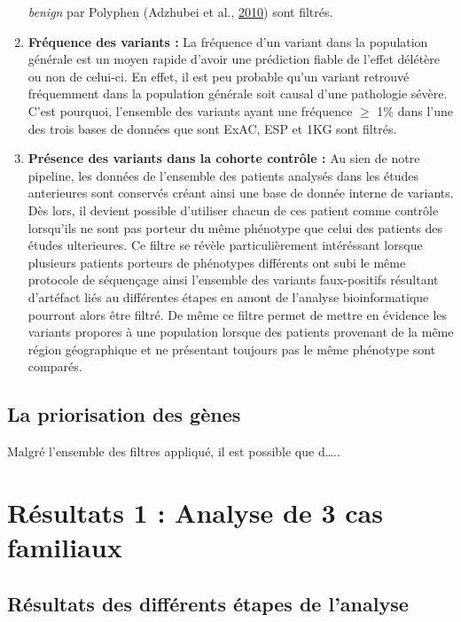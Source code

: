 \documentclass[12pt,twoside]{reedthesis}
\theoremstyle{definition}
\theoremstyle{definition}
\theoremstyle{remark}
\begin{document}
\begin{enumerate}
    \emph{benign} par Polyphen (Adzhubei et al.,
    \protect\hyperlink{ref-Adzhubei2010}{2010}) sont filtrés.
  \item
    \textbf{Fréquence des variants :} La fréquence d'un variant dans la
    population générale est un moyen rapide d'avoir une prédiction fiable
    de l'effet délétère ou non de celui-ci. En effet, il est peu probable
    qu'un variant retrouvé fréquemment dans la population générale soit
    causal d'une pathologie sévère. C'est pourquoi, l'ensemble des
    variants ayant une fréquence \(\ge\) 1\% dans l'une des trois bases de
    données que sont ExAC, ESP et 1KG sont filtrés.
  \item
    \textbf{Présence des variants dans la cohorte contrôle :} Au sien de
    notre pipeline, les données de l'ensemble des patients analysés dans
    les études anterieures sont conservés créant ainsi une base de donnée
    interne de variants. Dès lors, il devient possible d'utiliser chacun
    de ces patient comme contrôle lorsqu'ils ne sont pas porteur du même
    phénotype que celui des patients des études ulterieures. Ce filtre se
    révèle particulièrement intéréssant lorsque plusieurs patients
    porteurs de phénotypes différents ont subi le même protocole de
    séquençage ainsi l'ensemble des variants faux-positifs résultant
    d'artéfact liés au différentes étapes en amont de l'analyse
    bioinformatique pourront alors être filtré. De même ce filtre permet
    de mettre en évidence les variants propores à une population lorsque
    des patients provenant de la même région géographique et ne présentant
    toujours pas le même phénotype sont comparés.
  \end{enumerate}
  
  \newpage
  
  \subsection{La priorisation des gènes}\label{la-priorisation-des-genes}
  
  Malgré l'ensemble des filtres appliqué, il est possible que d\ldots{}..
  
  \newpage
  
  \section{Résultats 1 : Analyse de 3 cas
  familiaux}\label{resultats-1-analyse-de-3-cas-familiaux}
  
  \subsection{Résultats des différents étapes de
  l'analyse}\label{resultats-des-differents-etapes-de-lanalyse}
  
\end{document}
